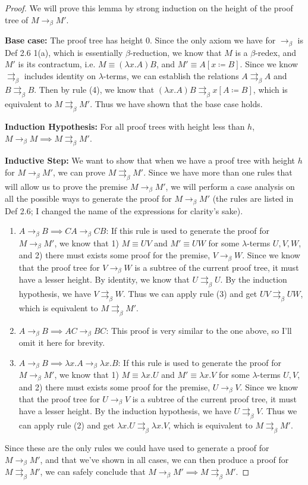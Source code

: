 \documentclass[a4paper,11pt]{article}
\theoremstyle{definition}
\theoremstyle{example}
\theoremstyle{lemma}
\newcommand{\lamterm}[2]{\lambda #1. #2}
\newcommand{\subs}[3]{#1[#2\coloneqq#3]}
\newcommand{\ssbr}{\rightarrow_{\beta}}
\newcommand{\pbr}{\rightrightarrows_{\beta}}
\begin{document}
\begin{proof}
We will prove this lemma by strong induction on the height of the proof tree of $M \ssbr M'$.

\textbf{Base case: }The proof tree has height $0$. Since the only axiom we have for $\ssbr$ is Def 2.6 1(a), which is essentially $\beta$-reduction, we know that $M$ is a $\beta$-redex, and $M'$ is its contractum, i.e. $M \equiv (\lamterm{x}{A})B$, and $M' \equiv \subs{A}{x}{B}$. Since we know $\pbr$ includes identity on $\lambda$-terms, we can establish the relations $A \pbr A$ and $B \pbr B$. Then by rule (4), we know that $(\lamterm{x}{A})B \pbr \subs{x}{A}{B}$, which is equivalent to $M \pbr M'$. Thus we have shown that the base case holds.

\textbf{Induction Hypothesis: }For all proof trees with height less than $h$, $M \ssbr M \implies M \pbr M'$.

\textbf{Inductive Step: }We want to show that when we have a proof tree with height $h$ for $M \ssbr M'$, we can prove $M \pbr M'$. Since we have more than one rules that will allow us to prove the premise $M \ssbr M'$, we will perform a case analysis on all the possible ways to generate the proof for $M \ssbr M'$ (the rules are listed in Def 2.6; I changed the name of the expressions for clarity's sake).
\begin{enumerate}[topsep=2pt,itemsep=-0.5ex,partopsep=1ex,parsep=1ex]
    \item $A \ssbr B \implies CA \ssbr CB$: If this rule is used to generate the proof for $M \ssbr M'$, we know that 1) $M \equiv UV$ and $M' \equiv UW$ for some $\lambda$-terms $U, V, W$, and 2) there must exists some proof for the premise, $V \ssbr W$. Since we know that the proof tree for $V \ssbr W$ is a subtree of the current proof tree, it must have a lesser height. By identity, we know that $U \pbr U$. By the induction hypothesis, we have $V \pbr W$. Thus we can apply rule (3) and get $UV \pbr UW$, which is equivalent to $M \pbr M'$.
    \item $A \ssbr B \implies AC \ssbr BC$: This proof is very similar to the one above, so I'll omit it here for brevity.
    \item $A \ssbr B \implies \lamterm{x}{A} \ssbr \lamterm{x}{B}$: If this rule is used to generate the proof for $M \ssbr M'$, we know that 1) $M \equiv \lamterm{x}{U}$ and $M' \equiv \lamterm{x}{V}$ for some $\lambda$-terms $U, V$, and 2) there must exists some proof for the premise, $U \ssbr V$. Since we know that the proof tree for $U \ssbr V$ is a subtree of the current proof tree, it must have a lesser height. By the induction hypothesis, we have $U \pbr V$. Thus we can apply rule (2) and get $\lamterm{x}{U} \pbr \lamterm{x}{V}$, which is equivalent to $M \pbr M'$.
\end{enumerate}
Since these are the only rules we could have used to generate a proof for $M \ssbr M'$, and that we've shown in all cases, we can then produce a proof for $M \pbr M'$, we can safely conclude that $M \ssbr M' \implies M \pbr M'$.
\end{proof}
\end{document}
